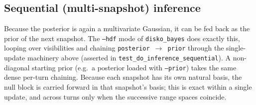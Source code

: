 \documentclass[11pt,a4paper]{article}
\begin{document}
\subsection{Sequential (multi-snapshot) inference}

Because the posterior is again a multivariate Gaussian, it can be fed back as
the prior of the next snapshot. The \texttt{--hdf} mode of
\texttt{disko\_bayes} does exactly this, looping over visibilities and chaining
\texttt{posterior $\to$ prior} through the single-update machinery above
(asserted in \texttt{test\_do\_inference\_sequential}).
A non-diagonal starting prior (e.g.\ a posterior loaded with
\texttt{--prior}) takes the same dense per-turn chaining. Because each
snapshot has its own natural basis, the null block is carried forward in that
snapshot's basis; this is exact within a single update, and across turns only
when the successive range spaces coincide.
\end{document}
